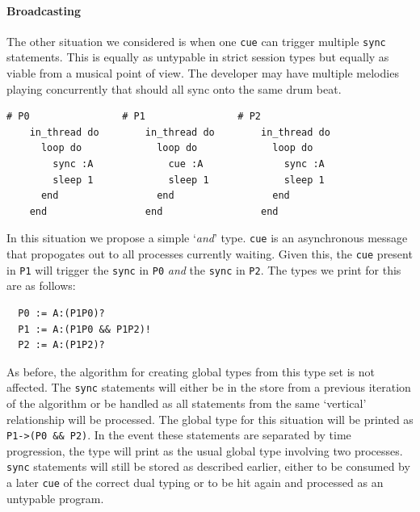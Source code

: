 \documentclass[11pt, abstracton, twoside, titlepage=true]{scrartcl}
\begin{document}
\paragraph{Broadcasting}
The other situation we considered is when one \texttt{cue} can trigger
multiple \texttt{sync} statements. This is equally as untypable in strict
session types but equally as viable from a musical point of view. The developer
may have multiple melodies playing concurrently that should all sync onto the
same drum beat.

\begin{minipage}{\textwidth}
	\begin{lstlisting}[style = sonicpi]
    # P0                # P1                # P2
    in_thread do        in_thread do        in_thread do
      loop do             loop do             loop do
        sync :A             cue :A              sync :A
        sleep 1             sleep 1             sleep 1
      end                 end                 end
    end                 end                 end
	\end{lstlisting}
\end{minipage}

In this situation we propose a simple `\emph{and}' type. \texttt{cue} is an
asynchronous message that propogates out to all processes currently waiting.
Given this, the \texttt{cue} present in \texttt{P1} will trigger the \texttt{sync}
in \texttt{P0} \emph{and} the \texttt{sync} in \texttt{P2}. The types we 
print for this are as follows:
\\
\begin{lstlisting}
  P0 := A:(P1P0)?
  P1 := A:(P1P0 && P1P2)!
  P2 := A:(P1P2)?
\end{lstlisting}

As before, the algorithm for creating global types from this type set is not
affected. The \texttt{sync} statements will either be in the store from a previous
iteration of the algorithm or be handled as all statements from the same `vertical'
relationship will be processed. The global type for this situation will be printed
as \texttt{P1->(P0 \&\& P2)}. In the event these statements are separated by time
progression, the type will print as the usual global type involving two processes.
\texttt{sync} statements will still be stored as described earlier, either to be
consumed by a later \texttt{cue} of the correct dual typing or to be hit again
and processed as an untypable program.
\end{document}
